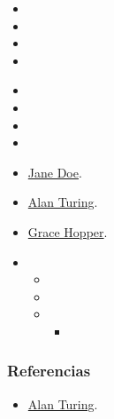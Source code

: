 \documentclass[a4paper,12pt]{mac_cv}
\begin{document}
\thispagestyle{title}
\pagestyle{body}

\CVIntro
\lipsum[1-3]

\CVObjetivosProfesionales
\lipsum[2-4]

\CVHabilidadesTransversales
\begin{itemize}
  \item \lipsum[5][1]
  \item \lipsum[5][2]
  \item \lipsum[5][3]
  \item \lipsum[5][4]
\end{itemize}

\CVExperienciasSignificativas
\begin{itemize}
  \item \lipsum[5][5]
  \item \lipsum[5][6]
  \item \lipsum[5][7]
  \item \lipsum[5][8]
\end{itemize}

\CVRelacionesSignificativas
\begin{itemize}
  \item \href{https://www.linkedin.com/in/}{Jane Doe}.
  \item \href{https://www.linkedin.com/in/}{Alan Turing}.
  \item \href{https://www.linkedin.com/in/}{Grace Hopper}.
\end{itemize}

\CVExperiencia
{}
\begin{itemize}
  \item \lipsum[8][1]
        \begin{itemize}
          \item \lipsum[8][2]
          \item \lipsum[8][3]
          \item \lipsum[8][4]
                \begin{itemize}
                  \item \lipsum[8][5]
                \end{itemize}
        \end{itemize}
\end{itemize}
\subsubsection*{Referencias}
\begin{itemize}
  \item \href{https://www.linkedin.com/in/}{Alan Turing}.
\end{itemize}
\end{document}
